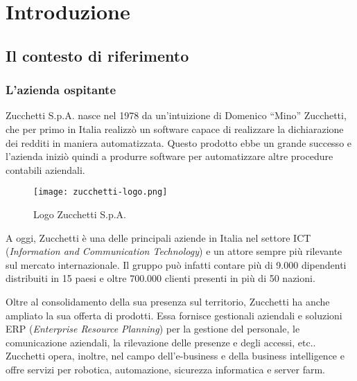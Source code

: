 \chapter{Introduzione}
\label{cap:introduzione}

\section{Il contesto di riferimento}
\subsection{L'azienda ospitante}
Zucchetti S.p.A. nasce nel 1978 da un'intuizione di Domenico ``Mino'' Zucchetti, 
che per primo in Italia realizzò un software capace di realizzare la dichiarazione
dei redditi in maniera automatizzata.
Questo prodotto ebbe un grande successo e l'azienda iniziò quindi a produrre
software per automatizzare altre procedure contabili aziendali.

\begin{figure}[h!] 
    \centering 
    \texttt{[image: zucchetti-logo.png]} 
    \caption{Logo Zucchetti S.p.A.}
\end{figure}

\noindent A oggi, Zucchetti è una delle principali aziende in Italia nel settore ICT 
(\emph{Information and Communication Technology}) e un attore sempre 
più rilevante sul mercato internazionale.
Il gruppo può infatti contare più di 9.000 dipendenti distribuiti in 15 paesi 
e oltre 700.000 clienti presenti in più di 50 nazioni.

Oltre al consolidamento della sua presenza sul territorio, Zucchetti ha anche 
ampliato la sua offerta di prodotti.
Essa fornisce gestionali aziendali e soluzioni ERP (\emph{Enterprise Resource Planning})
per la gestione del personale, le comunicazione aziendali, la rilevazione delle 
presenze e degli accessi, etc.. 
Zucchetti opera, inoltre, nel campo dell'e-business e della business intelligence e
offre servizi per robotica, automazione, sicurezza informatica e server farm.



